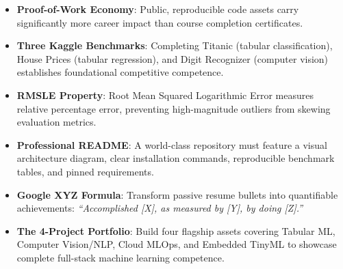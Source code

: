 \begin{takeaways}
\begin{itemize}
    \item \textbf{Proof-of-Work Economy}: Public, reproducible code assets carry significantly more career impact than course completion certificates.
    \item \textbf{Three Kaggle Benchmarks}: Completing Titanic (tabular classification), House Prices (tabular regression), and Digit Recognizer (computer vision) establishes foundational competitive competence.
    \item \textbf{RMSLE Property}: Root Mean Squared Logarithmic Error measures relative percentage error, preventing high-magnitude outliers from skewing evaluation metrics.
    \item \textbf{Professional README}: A world-class repository must feature a visual architecture diagram, clear installation commands, reproducible benchmark tables, and pinned requirements.
    \item \textbf{Google XYZ Formula}: Transform passive resume bullets into quantifiable achievements: \emph{``Accomplished [X], as measured by [Y], by doing [Z].''}
    \item \textbf{The 4-Project Portfolio}: Build four flagship assets covering Tabular ML, Computer Vision/NLP, Cloud MLOps, and Embedded TinyML to showcase complete full-stack machine learning competence.
\end{itemize}
\end{takeaways}

